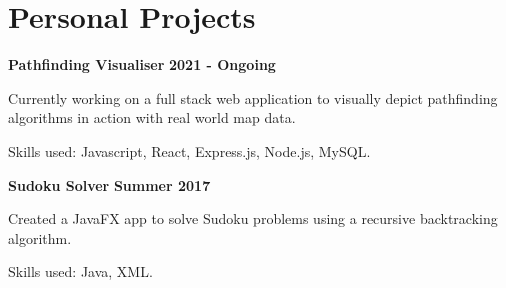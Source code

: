 \documentclass[a4paper, 11pt, hidelinks]{article}
\newcommand{\textsb}[1]{
	\fontseries{sb}\selectfont #1 \normalfont
}
\newcommand{\xp}[3]{
	\vspace{0.25em}
	\textbf{\large#1} \quad \emph{\large#2} \hfill \textbf{\large#3}
}
\begin{document}
\begin{minipage}{0.587\textwidth}
	\section{Personal Projects}
	\xp{Pathfinding Visualiser}{}{2021 - Ongoing}
	\begin{itemise}
		\item Currently working on a full stack web application to visually depict pathfinding algorithms in action with real world map data.
		\item \textsb{Skills used:} Javascript, React, Express.js, Node.js, MySQL.
		\hfill
		\href{https://github.com/Francis-Gurr/Pathfinding-Visualiser}{\faLink}
	\end{itemise}
	\xp{Sudoku Solver}{}{Summer 2017}
	\begin{itemise}
		\item Created a JavaFX app to solve Sudoku problems using a recursive backtracking algorithm.
		\item \textsb{Skills used:} Java, XML.
		\hfill
		\href{https://github.com/Francis-Gurr/Sudoku-Solver}{\faLink}
	\end{itemise}
\end{minipage}
\end{document}
